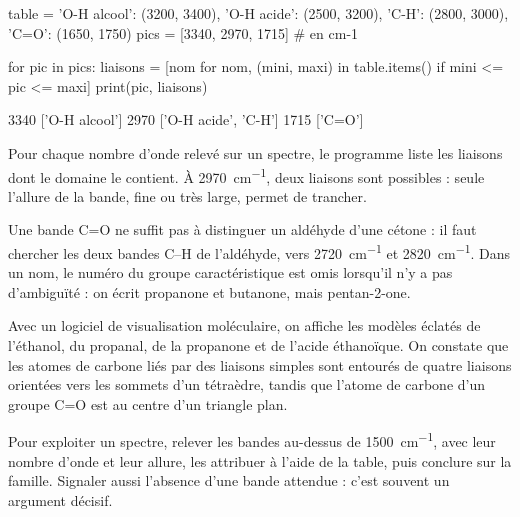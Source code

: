 \begin{python}
table = {'O-H alcool': (3200, 3400), 'O-H acide': (2500, 3200),
         'C-H': (2800, 3000), 'C=O': (1650, 1750)}
pics = [3340, 2970, 1715]          # en cm-1

for pic in pics:
    liaisons = [nom for nom, (mini, maxi) in table.items() if mini <= pic <= maxi]
    print(pic, liaisons)
\end{python}
\begin{console}
3340 ['O-H alcool']
2970 ['O-H acide', 'C-H']
1715 ['C=O']
\end{console}
\noindent{} Pour chaque nombre d'onde relevé sur un spectre, le programme liste les liaisons dont le domaine le
contient. À \qty{2970}{cm^{-1}}, deux liaisons sont possibles : seule l'allure de la bande, fine ou très large, permet de trancher.
\begin{attention}
Une bande C=O ne suffit pas à distinguer un aldéhyde d'une cétone : il faut chercher les deux bandes C--H de l'aldéhyde,
vers \qty{2720}{cm^{-1}} et \qty{2820}{cm^{-1}}. Dans un nom, le numéro du groupe caractéristique est omis lorsqu'il n'y a pas d'ambiguïté :
on écrit propanone et butanone, mais pentan-2-one.
\end{attention}
\begin{experience}
Avec un logiciel de visualisation moléculaire, on affiche les modèles éclatés de l'éthanol, du propanal, de la propanone
et de l'acide éthanoïque. On constate que les atomes de carbone liés par des liaisons simples sont entourés de quatre
liaisons orientées vers les sommets d'un tétraèdre, tandis que l'atome de carbone d'un groupe C=O est au centre d'un
triangle plan.
\end{experience}
\begin{rediger}
Pour exploiter un spectre, relever les bandes au-dessus de \qty{1500}{cm^{-1}}, avec leur nombre d'onde et leur allure, les attribuer à
l'aide de la table, puis conclure sur la famille. Signaler aussi l'absence d'une bande attendue : c'est souvent un argument
décisif.
\end{rediger}
\exercices

